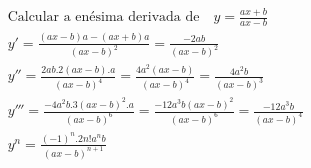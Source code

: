 \begin{ex}
\begin{align}
&\text{Calcular a enésima derivada de} \quad y=\frac{ax+b}{ax-b}\nonumber\\
&y'=\frac{(ax-b)a-(ax+b)a}{(ax-b)^2}=\frac{-2ab}{(ax-b)^2}\nonumber\\
&y''=\frac{2ab.2(ax-b).a}{(ax-b)^4}=\frac{4a^2(ax-b)}{(ax-b)^4}=\frac{4a^2b}{(ax-b)^3}\nonumber\\
&y'''=\frac{-4a^2b.3(ax-b)^2.a}{(ax-b)^6}=\frac{-12a^3b(ax-b)^2}{(ax-b)^6}=\frac{-12a^3b}{(ax-b)^4}\nonumber\\
&y^{n}=\frac{(-1)^n.2n!a^{n}b}{(ax-b)^{n+1}}\nonumber
\end{align}
\end{ex}



